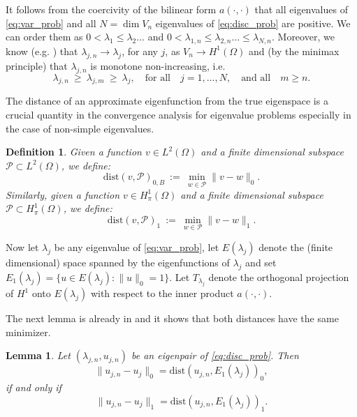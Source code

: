 \documentclass[preprint,12pt]{elsarticle}
\newtheorem{lemma}[theorem]{Lemma}
\newtheorem{definition}[theorem]{Definition}
\newcommand{\cB}{{B}}
\begin{document}
It follows from the coercivity of the bilinear form $a(\cdot,\cdot)$ that
all eigenvalues of  \eqref{eq:var_prob} and all $N=\dim V_n$
eigenvalues of \eqref{eq:disc_prob} are positive.
We can order
them as $0 < \lambda_1 \leq \lambda_2 \ldots $ and $0 < \lambda_{1,n}
\leq \lambda_{2,n} \ldots \leq \lambda_{N,n}$. Moreover, we know (e.g. 
\cite{BaOs:89}) that  $\lambda_{j,n} \rightarrow \lambda_j$,
for any
$j$,  as  $V_n
\rightarrow H^1(\Omega)$ and (by the minimax principle) 
that $\lambda_{j,n}$ is monotone
non-increasing, i.e.
\begin{equation}\label{eq:minimax_shift}
\lambda_{j,n} \ \geq\  \lambda_{j,m}\  \geq\   \lambda_j , \quad
\text{for all} \quad j = 1, \ldots , N, \quad \text{and all} \quad
m \geq n .
\end{equation}

The distance of an approximate eigenfunction from the true eigenspace
is a crucial quantity in the convergence analysis for
eigenvalue problems  especially in the case of non-simple
eigenvalues.

\begin{definition}
\label{def:dist_l2}
Given a function $v\in L^2(\Omega)$ and a finite dimensional subspace $\mathcal{P}\subset L^2(\Omega)$, we define:
$$
\mathrm{dist}(v,\mathcal{P})_{0,\cB}\ :=\ \min_{ w\in\mathcal{P}}  \|v-w\|_{0} .
$$
Similarly, given a function $v\in H^1_\pi(\Omega)$ and a finite dimensional subspace $\mathcal{P}\subset H^1_\pi(\Omega)$, we define:
$$
\mathrm{dist}(v,\mathcal{P})_{1}\ :=\ \min_{ w\in\mathcal{P}}  \|v-w\|_{1} .
$$
\end{definition}

Now let $\lambda_j$ be any eigenvalue of 
\eqref{eq:var_prob},  let $E(\lambda_j)$ denote the (finite
dimensional) space spanned by  the eigenfunctions of  $\lambda_j$ and set
$E_1(\lambda_j)=\{u\in E(\lambda_j):
\|u\|_{0}=1\}$. 
{Let $T_{\lambda_j}$
  denote the orthogonal projection of $H^1$ onto $E(\lambda_j)$ with respect
  to the inner product $a(\cdot, \cdot)$.}

The next lemma is already in \cite{pcf_apost} and it shows that both distances have the same minimizer.


\begin{lemma}\label{lm:inf_l2_h1}
 Let $(\lambda_{j,n},u_{j,n})$ be an eigenpair of \eqref{eq:disc_prob}. Then
\begin{equation}\label{eq:inf_l2_h1_1}
\|u_{j,n}-u_j\|_{0} = \mathrm{dist}(u_{j,n},E_1(\lambda_j))_{0},
\end{equation}
if and only if
\begin{equation}\label{eq:inf_l2_h1_2}
\|{u_{j,n}-u_j}\|_{1}=\mathrm{dist}(u_{j,n},E_1(\lambda_j))_{1}.
\end{equation}

\end{lemma}
\end{document}
